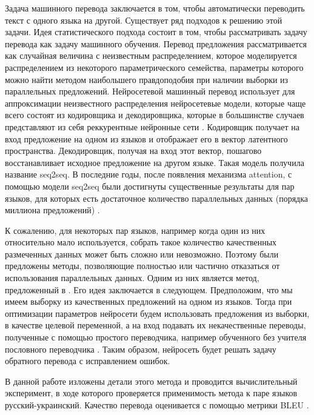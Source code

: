 \documentclass[12pt,twoside]{article}
\begin{document}
   Задача машинного перевода заключается в том, чтобы автоматически переводить текст с одного языка на другой. Существует ряд подходов к решению этой задачи. Идея статистического подхода состоит в том, чтобы рассматривать задачу перевода как задачу машинного обучения. Перевод предложения рассматривается как случайная величина с неизвестным распределением, которое моделируется распределением из некоторого параметрического семейства, параметры которого можно найти методом наибольшего правдоподобия при наличии выборки из параллельных предложений. Нейросетевой машинный перевод использует для аппроксимации неизвестного распределения нейросетевые модели, которые чаще всего состоят из кодировщика и декодировщика, которые в большинстве случаев представляют из себя реккурентные нейронные сети \cite{sutskever2014sequence, cho2014properties}. Кодировщик получает на вход предложение на одном из языков и отображает его в вектор латентного пространства. Декодировщик, получая на вход этот вектор, пошагово восстанавливает исходное предложение на другом языке. Такая модель получила название seq2seq. В последние годы, после появления механизма attention, с помощью модели seq2seq были достигнуты существенные результаты для пар языков, для которых есть достаточное количество параллельных данных (порядка миллиона предложений) \cite{bahdanau2014neural, luong2015effective}. 
   
   К сожалению, для некоторых пар языков, например когда один из них относительно мало используется, собрать такое количество качественных размеченных данных может быть сложно или невозможно. Поэтому были предложены методы, позволяющие полностью или частично отказаться от использования параллельных данных. Одним из них является метод, предложенный в \cite{lample2017unsupervised}. Его идея заключается в следующем. Предположим, что мы имеем выборку из качественных предложений на одном из языков. Тогда при оптимизации параметров нейросети будем использовать предложения из выборки, в качестве целевой переменной, а на вход подавать их некачественные переводы, полученные с помощью простого переводчика, например обученного без учителя пословного переводчика \cite{conneau2017word}. Таким образом, нейросеть будет решать задачу обратного перевода с исправлением ошибок.
   
   В данной работе изложены детали этого метода и проводится вычислительный эксперимент, в ходе которого проверяется применимость метода к паре языков русский-украинский. Качество перевода оценивается с помощью метрики BLEU \cite{papineni2002bleu}.
\end{document}

